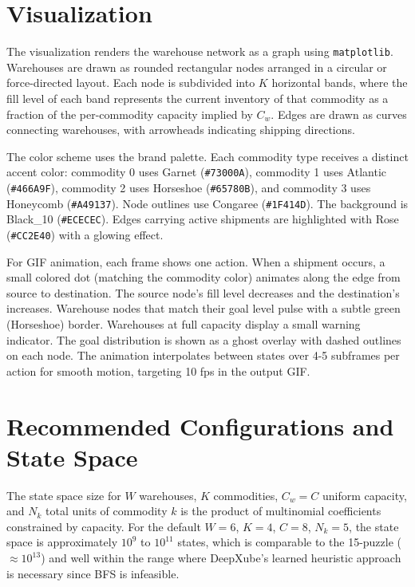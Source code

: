 \documentclass[11pt]{article}
\begin{document}
\section{Visualization}

The visualization renders the warehouse network as a graph using \texttt{matplotlib}. Warehouses are drawn as rounded rectangular nodes arranged in a circular or force-directed layout. Each node is subdivided into $K$ horizontal bands, where the fill level of each band represents the current inventory of that commodity as a fraction of the per-commodity capacity implied by $C_w$. Edges are drawn as curves connecting warehouses, with arrowheads indicating shipping directions.

The color scheme uses the brand palette. Each commodity type receives a distinct accent color: commodity 0 uses Garnet (\texttt{\#73000A}), commodity 1 uses Atlantic (\texttt{\#466A9F}), commodity 2 uses Horseshoe (\texttt{\#65780B}), and commodity 3 uses Honeycomb (\texttt{\#A49137}). Node outlines use Congaree (\texttt{\#1F414D}). The background is Black\_10 (\texttt{\#ECECEC}). Edges carrying active shipments are highlighted with Rose (\texttt{\#CC2E40}) with a glowing effect.

For GIF animation, each frame shows one action. When a shipment occurs, a small colored dot (matching the commodity color) animates along the edge from source to destination. The source node's fill level decreases and the destination's increases. Warehouse nodes that match their goal level pulse with a subtle green (Horseshoe) border. Warehouses at full capacity display a small warning indicator. The goal distribution is shown as a ghost overlay with dashed outlines on each node. The animation interpolates between states over 4-5 subframes per action for smooth motion, targeting 10 fps in the output GIF.

\section{Recommended Configurations and State Space}

The state space size for $W$ warehouses, $K$ commodities, $C_w = C$ uniform capacity, and $N_k$ total units of commodity $k$ is the product of multinomial coefficients constrained by capacity. For the default $W = 6$, $K = 4$, $C = 8$, $N_k = 5$, the state space is approximately $10^{9}$ to $10^{11}$ states, which is comparable to the 15-puzzle ($\approx 10^{13}$) and well within the range where DeepXube's learned heuristic approach is necessary since BFS is infeasible.
\end{document}
